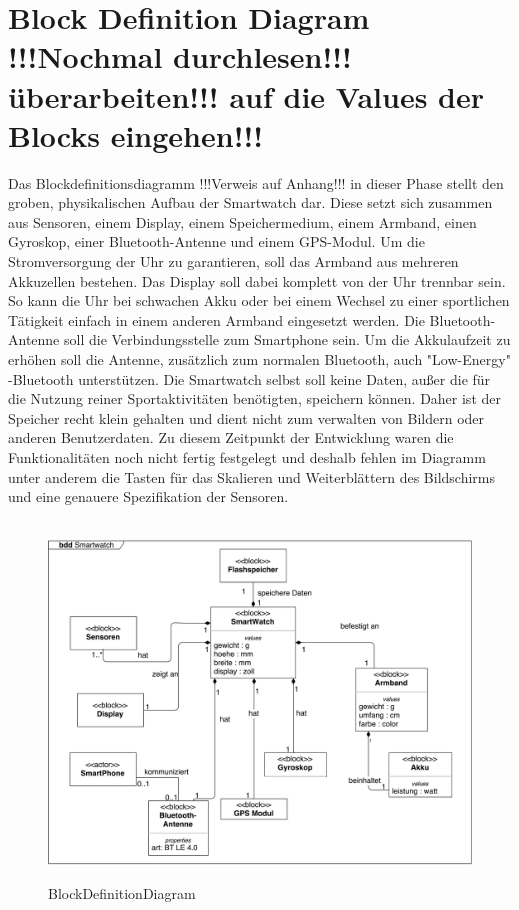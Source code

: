 \section{Block Definition Diagram !!!Nochmal durchlesen!!!überarbeiten!!! auf die Values der Blocks eingehen!!!}

Das Blockdefinitionsdiagramm !!!Verweis auf Anhang!!! in dieser Phase stellt den groben, physikalischen Aufbau der Smartwatch dar. Diese setzt sich zusammen aus Sensoren, einem Display, einem Speichermedium, einem Armband, einen Gyroskop, einer Bluetooth-Antenne und einem GPS-Modul. Um die Stromversorgung der Uhr zu garantieren, soll das Armband aus mehreren Akkuzellen bestehen. Das Display soll dabei komplett von der Uhr trennbar sein. So kann die Uhr bei schwachen Akku oder bei einem Wechsel zu einer sportlichen Tätigkeit einfach in einem anderen Armband eingesetzt werden. Die Bluetooth-Antenne soll die Verbindungsstelle zum Smartphone sein. Um die Akkulaufzeit zu erhöhen soll die Antenne, zusätzlich zum normalen Bluetooth, auch "Low-Energy" -Bluetooth unterstützen. Die Smartwatch selbst soll keine Daten, außer die für die Nutzung reiner Sportaktivitäten benötigten, speichern können. Daher ist der Speicher recht klein gehalten und dient nicht zum verwalten von Bildern oder anderen Benutzerdaten. 
Zu diesem Zeitpunkt der Entwicklung waren die Funktionalitäten noch nicht fertig festgelegt und deshalb fehlen im Diagramm unter anderem die Tasten für das Skalieren und Weiterblättern des Bildschirms und eine genauere Spezifikation der Sensoren. 

\begin{figure}[htb]
\centering\
\includegraphics[width=\textwidth]{img/block1}
\caption{BlockDefinitionDiagram}\label{fig:block1}
\end{figure}

